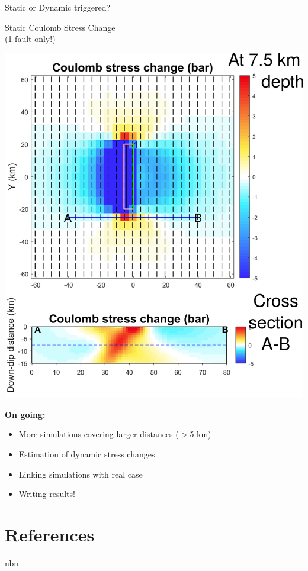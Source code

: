 \documentclass{beamer}
\newcommand\dirbiblio{../../biblio}
\begin{document}
\begin{frame}
 {Static or Dynamic triggered?}
 
 
 \begin{minipage}{0.45\linewidth}
 \begin{center}
  {\large Static Coulomb Stress Change} \\ 
  (1 fault only!)
 \end{center}
  \includegraphics[width=1\linewidth]{images/CSC.png}
 \end{minipage}
 \begin{minipage}{0.45\linewidth}
 {\bf On going:}
  \begin{itemize}
   \item More simulations covering larger distances ($>$5 km)
   \\
   \item Estimation of dynamic stress changes
   \\
   \item Linking simulations with real case
   \\
   \item Writing results!
  \end{itemize}
 \end{minipage}

 
\end{frame}




\section*{References}
\begin{frame}nbn 

    {\tiny  }							    

\end{frame}
\end{document}
